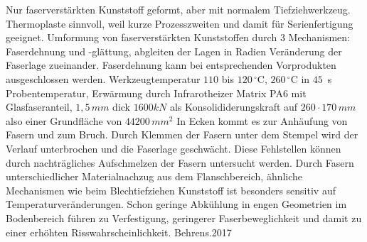 Nur faserverstärkten Kunststoff geformt, aber mit normalem Tiefziehwerkzeug. Thermoplaste sinnvoll, weil kurze Prozesszweiten und damit für Serienfertigung geeignet. Umformung von faserverstärkten Kunststoffen durch 3 Mechanismen: Faserdehnung und -glättung, abgleiten der Lagen in Radien Veränderung der Faserlage zueinander.  Faserdehnung kann bei entsprechenden Vorprodukten ausgeschlossen werden. Werkzeugtemperatur $110$ bis $120 \, ^\circ \text{C}$, $260 \, ^\circ \text{C}$ in $45\,$ s Probentemperatur, Erwärmung durch Infrarotheizer
Matrix PA6 mit Glasfaseranteil, $1,5\, mm$ dick
$1600 kN$ als Konsolididerungskraft auf $260 \cdot 170 \, mm$ also einer Grundfläche von $44200 \, mm^2$
In Ecken kommt es zur Anhäufung von Fasern und zum Bruch. Durch Klemmen der Fasern unter dem Stempel wird der Verlauf unterbrochen und die Faserlage geschwächt. Diese Fehlstellen können durch nachträgliches Aufschmelzen der Fasern untersucht werden. Durch Fasern unterschiedlicher Materialnachzug aus dem Flanschbereich, ähnliche Mechanismen wie beim Blechtiefziehen
Kunststoff ist besonders sensitiv auf Temperaturveränderungen. Schon geringe Abkühlung in engen Geometrien im Bodenbereich führen zu Verfestigung, geringerer Faserbeweglichkeit und damit zu einer erhöhten Risswahrscheinlichkeit.   
Behrens.2017

